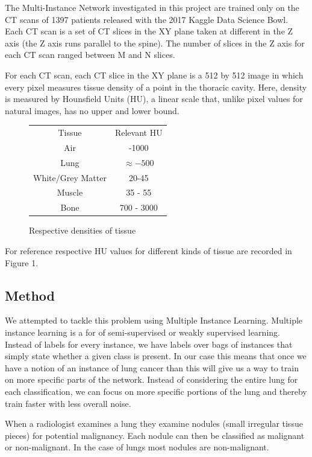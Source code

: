 \documentclass[twocolumn,10pt]{article}
\newcommand{\red}[1]{{\color{red}#1}}
\begin{document}
The Multi-Instance Network investigated in this project are trained only on the
CT scans of 1397 patients released with the 2017 Kaggle Data Science Bowl. Each 
CT scan is a set of CT slices in the XY plane taken at different in the Z axis
(the Z axis runs parallel to the spine). The number of slices in the Z axis 
for each CT scan ranged between \red{M} and \red{N} slices.

For each CT scan, each CT slice in the XY plane is a 512 by 512 image in which
every pixel measures tissue density of a point in the thoracic cavity. Here,
density is measured by Hounsfield Units (HU), a linear scale that, unlike 
pixel values for natural images, has no upper and lower bound.
\begin{figure}[H]
\begin{center}
\label{hu_table}
\begin{tabular}{|c|c|}
\hline
Tissue & Relevant HU \\ \hhline{|=|=|}
Air & -1000 \\ \hline
Lung & $\approx -500$ \\ \hline
White/Grey Matter & 20-45 \\ \hline
Muscle & 35 - 55 \\ \hline
Bone & 700 - 3000\\ \hline
\end{tabular}
\end{center}
\caption{Respective densities of tissue}
\end{figure}
For reference respective HU values for different kinds of tissue are recorded in
Figure 1.



\subsection{Method}

We attempted to tackle this problem using Multiple Instance Learning. Multiple instance learning is a for of semi-supervised or weakly supervised learning. Instead of labels for every instance, we have labels over bags of instances that simply state whether a given class is present. In our case this means that once we have a notion of an instance of lung cancer than this will give us a way to train on more specific parts of the network. Instead of considering the entire lung for each classification, we can focus on more specific portions of the lung and thereby train faster with less overall noise.

When a radiologist examines a lung they examine nodules (small irregular tissue pieces) for potential malignancy. Each nodule can then be classified as malignant or non-malignant. In the case of lungs most nodules are non-malignant.
\end{document}
